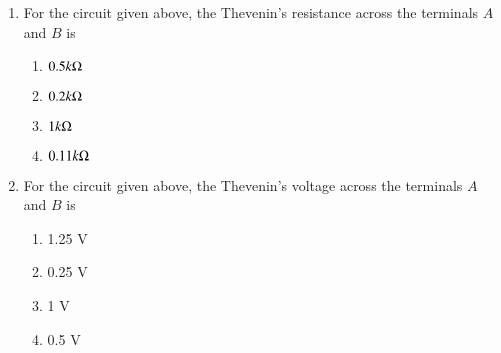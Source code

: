 \documentclass[journal]{IEEEtran}
\begin{document}
\begin{enumerate}
\item For the circuit given above, the Thevenin's resistance across the terminals $A$ and $B$ is
\begin{multicols}{2}
\begin{enumerate}
\item $0.5k\ohm$
\item $0.2k\ohm$
\item $1k\ohm$
\item $0.11k\ohm$
\end{enumerate}
\end{multicols}


\item For the circuit given above, the Thevenin's voltage across the terminals $A$ and $B$ is
\begin{multicols}{2}
\begin{enumerate}
\item 1.25 V
\item 0.25 V
\item 1 V
\item 0.5 V
\end{enumerate}
\end{multicols}
\end{enumerate}
\end{document}
